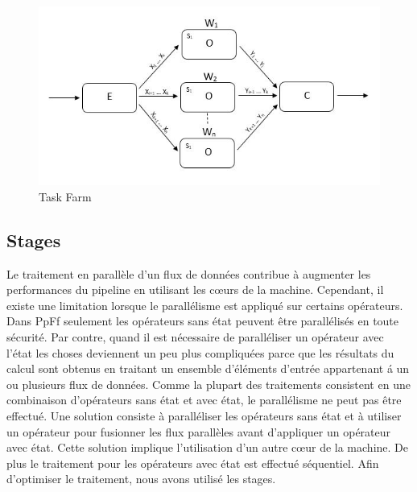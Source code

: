 \begin{figure}[ht]
\centering
     \includegraphics[width=1.0\textwidth]{Figures/ParallelismeTaskFarm.jpg}
      \caption{Task Farm}
       \label{ParallelismeTaskFarm.fig}
\end{figure}




\subsection{Stages}

Le traitement en parall\`ele d'un flux de donn\'ees contribue \`a augmenter les performances du pipeline en utilisant les cœurs de la machine. Cependant, il existe une limitation lorsque le parall\'elisme est appliqu\'e sur certains op\'erateurs. Dans PpFf seulement les op\'erateurs sans \'etat peuvent \^etre parall\'elis\'es en toute s\'ecurit\'e. Par contre, quand il est n\'ecessaire de parall\'eliser un op\'erateur avec l'\'etat les choses deviennent un peu plus compliqu\'ees parce que les r\'esultats du calcul sont obtenus en traitant un ensemble d'\'el\'ements d'entrée appartenant \'a un ou plusieurs flux de donn\'ees. Comme la plupart des traitements consistent en une combinaison d'op\'erateurs sans \'etat et avec \'etat, le parall\'elisme ne peut pas \^etre effectu\'e. Une solution consiste \`a parall\'eliser les op\'erateurs sans \'etat et \`a utiliser un op\'erateur  pour fusionner les flux parall\`eles avant d'appliquer un op\'erateur avec \'etat. Cette solution implique l'utilisation d'un autre cœur de la machine. De plus le traitement pour les op\'erateurs avec \'etat est effectu\'e s\'equentiel. Afin d'optimiser le traitement, nous avons utilis\'e les stages.

